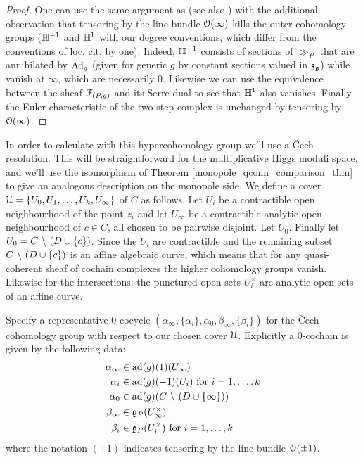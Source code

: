 \documentclass[10pt, oneside]{article}
\renewcommand{\ad}{\mr{ad}}
\newcommand{\Ad}{\mr{Ad}}
\begin{document}
\begin{proof}
One can use the same argument as \cite[]{HurtubiseMarkman} (see also \cite[Proposition 5.6]{CharbonneauHurtubise}) with the additional observation that tensoring by the line bundle $\mathcal{O}(\infty)$ kills the outer cohomology groups ($\mathbb{H}^{-1}$ and $\mathbb{H}^1$ with our degree conventions, which differ from the conventions of loc. cit. by one).  Indeed, $\mathbb{H}^{-1}$ consists of sections of $\gg_P$ that are annihilated by $\Ad_g$ (given for generic $g$ by constant sections valued in $\mathfrak{z}_{\mathfrak{g}}$) while vanish at $\infty$, which are necessarily 0.  Likewise we can use the equivalence between the sheaf $\mathcal{F}_{(P,g)}$ and its Serre dual to see that $\mathbb{H}^1$ also vanishes.  Finally the Euler characteristic of the two step complex is unchanged by tensoring by $\mathcal{O}(\infty)$. 
\end{proof}

In order to calculate with this hypercohomology group we'll use a \v Cech resolution.  This will be straightforward for the multiplicative Higgs moduli space, and we'll use the isomorphism of Theorem \ref{monopole_qconn_comparison_thm} to give an analogous description on the monopole side.    We define a cover $\mathcal{U} = \{U_0, U_1, \ldots, U_k, U_\infty\}$ of $C$ as follows.  Let $U_i$ be a contractible open neighbourhood of the point $z_i$ and let $U_\infty$ be a contractible analytic open neighbourhood of $c \in C$, all chosen to be pairwise disjoint.  Let $U_0$.  Finally let $U_0 = C \ \backslash \  (D \cup \{c\})$.  Since the $U_i$ are contractible and the remaining subset $C \ \backslash \  (D \cup \{c\})$ is an affine algebraic curve, which means that for any quasi-coherent sheaf of cochain complexes the higher cohomology groups vanish.  Likewise for the intersections: the punctured open sets $U_i^\times$ are analytic open sets of an affine curve.  

Specify a representative 0-cocycle $(\alpha_\infty, \{\alpha_i\}, \alpha_0, \beta_\infty, \{\beta_i\})$ for the \v Cech cohomology group with respect to our chosen cover $\mathcal{U}$.  Explicitly a 0-cochain is given by the following data:
\begin{align*}
 \alpha_\infty &\in \ad(g)(1)(U_\infty) \\
 \alpha_i &\in \ad(g)(-1)(U_i) \text{ for } i = 1,\ldots,k \\
 \alpha_0 &\in \ad(g)(C \bs (D \cup \{\infty\})) \\
 \beta_\infty &\in \gg_P(U^\times_\infty) \\
 \beta_i &\in \gg_P(U^\times_i) \text{ for } i=1,\ldots,k
\end{align*}
where the notation $(\pm 1)$ indicates tensoring by the line bundle $\mathcal{O}(\pm 1)$.
\end{document}

